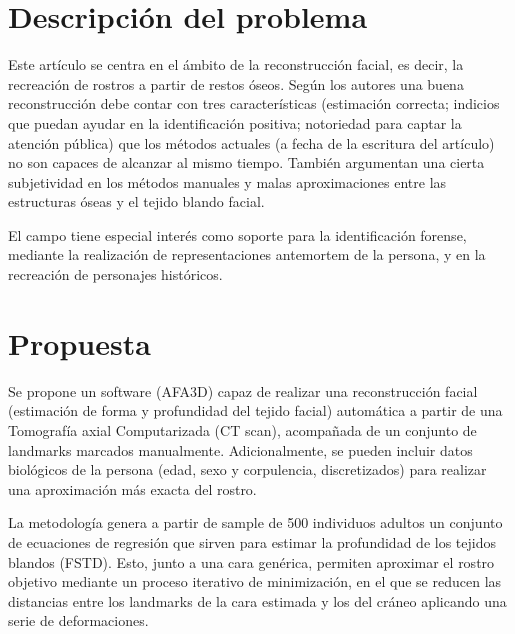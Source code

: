 \documentclass[13pt,a4paper]{article}
\begin{document}
    
    

    \newpage


\section{Descripción del problema}
Este artículo se centra en el ámbito de la reconstrucción facial, es decir, la recreación de rostros a partir de restos óseos. Según los autores una buena reconstrucción debe contar con tres características (estimación correcta; indicios que puedan ayudar en la identificación positiva; notoriedad para captar la atención pública) que los métodos actuales (a fecha de la escritura del artículo) no son capaces de alcanzar al mismo tiempo. También argumentan una cierta subjetividad en los métodos manuales y malas aproximaciones entre las estructuras óseas y el tejido blando facial.

El campo tiene especial interés como soporte para la identificación forense, mediante la realización de representaciones antemortem de la persona, y en la recreación de personajes históricos.

\section{Propuesta}
Se propone un software (AFA3D) capaz de realizar una reconstrucción facial (estimación de forma y profundidad del tejido facial) automática a partir de una Tomografía axial Computarizada (CT scan), acompañada de un conjunto de landmarks marcados manualmente. Adicionalmente, se pueden incluir datos biológicos de la persona (edad, sexo y corpulencia, discretizados) para realizar una aproximación más exacta del rostro.

\vspace{\baselineskip}

La metodología genera a partir de sample de 500 individuos adultos un conjunto de ecuaciones de regresión que sirven para estimar la profundidad de los tejidos blandos (FSTD). Esto, junto a una cara genérica, permiten aproximar el rostro objetivo mediante un proceso iterativo de minimización, en el que se reducen las distancias entre los landmarks de la cara estimada y los del cráneo aplicando una serie de deformaciones.
\end{document}
